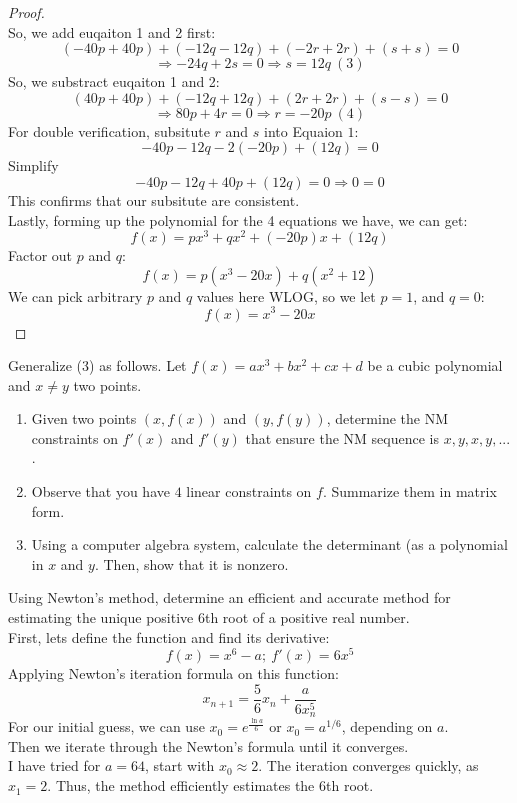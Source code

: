 \documentclass{article}
\begin{document}
\begin{proof}
    \\
    So, we add euqaiton 1 and 2 first:
    \[ (-40p + 40p) + (-12q - 12q) + (-2r + 2r) + (s + s) = 0 \]
    \[ \Rightarrow -24q + 2s = 0 \Longrightarrow s = 12q \ (3) \]
    So, we substract euqaiton 1 and 2:\
    \[ (40p + 40p) + (-12q + 12q) + (2r + 2r) + (s - s) = 0 \]
    \[ \Rightarrow 80p + 4r = 0 \Longrightarrow r = -20p \ (4) \]
    For double verification, subsitute $r$ and $s$ into Equaion $1$:
    \[ -40p - 12q - 2(-20p) + (12q) = 0 \]
    Simplify
    \[ -40p - 12q + 40p + (12q) = 0 \Longrightarrow 0 = 0 \]
    This confirms that our subsitute are consistent.
    \\
    Lastly, forming up the polynomial for the 4 equations we have, we can get:
    \[ f(x) = px^3 + qx^2 + (-20p)x + (12q) \]
    Factor out $p$ and $q$:
    \[ f(x) = p(x^3 - 20x) + q(x^2 + 12) \]
    We can pick arbitrary $p$ and $q$ values here WLOG, so we let $p = 1$, and $q = 0$:
    \[ f(x) = x^3 - 20x \]
\end{proof}

\begin{problem}
    Generalize (3) as follows. Let \(f(x) = ax^3 + bx^2 + cx +d\) be a cubic polynomial and \(x\neq y\) two points.
    \begin{enumerate}
        \item Given two points \((x,f(x))\) and \((y,f(y))\), determine the NM constraints on \(f'(x)\) and \(f'(y)\) that ensure the NM sequence is \(x,y,x,y,...\).
        \item Observe that you have \(4\) linear constraints on \(f\). Summarize them in matrix form.
        \item Using a computer algebra system, calculate the determinant (as a polynomial in \(x\) and \(y\). Then, show that it is nonzero.
    \end{enumerate}
\end{problem}

\begin{problem}
    Using Newton's method, determine an efficient and accurate method for estimating the unique positive \(6\)th root of a positive real number.
    \\
    First, lets define the function and find its derivative: 
    \[ f(x) = x^6 - a; \ f'(x) = 6x^5 \]
    Applying Newton's iteration formula on this function:
    \[ x_{n+1} = \frac{5}{6}x_n + \frac{a}{6x_n^5} \]
    For our initial guess, we can use \( x_0 = e^{\frac{\ln a}{6}} \) or \( x_0 = a^{1/6} \), depending on \(a\).
    \\
    Then we iterate through the Newton's formula until it converges.
    \\
    I have tried for \( a = 64 \), start with \( x_0 \approx 2 \). The iteration converges quickly, as \( x_1 = 2 \). Thus, the method efficiently estimates the \(6\)th root.
\end{problem}
\end{document}
